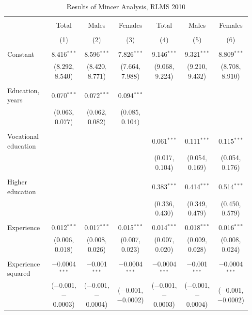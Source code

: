 \documentclass[alpha-refs]{wiley-article-01g}
\begin{document}
\begin{landscape}

\fontsize{9}{11}
\selectfont

\begin{table}[!htbp] \centering 
\renewcommand{\arraystretch}{1.0}
  \caption{Results of Mincer Analysis, RLMS 2010} 
  \label{} 
\begin{tabular}{@{\extracolsep{5pt}}lcccccc} 
\\[-1.8ex]\hline 
\hline \\[-1.8ex] 
 & Total & Males & Females & Total & Males & Females \\ 
\\[-1.8ex] & (1) & (2) & (3) & (4) & (5) & (6)\\ 
\hline \\[-1.8ex] 
 Constant & 8.416$^{***}$ & 8.596$^{***}$ & 7.826$^{***}$ & 9.146$^{***}$ & 9.321$^{***}$ & 8.809$^{***}$ \\ 
  & (8.292, 8.540) & (8.420, 8.771) & (7.664, 7.988) & (9.068, 9.224) & (9.210, 9.432) & (8.708, 8.910) \\ 
  & & & & & & \\ 
 Education, years & 0.070$^{***}$ & 0.072$^{***}$ & 0.094$^{***}$ &  &  &  \\ 
  & (0.063, 0.077) & (0.062, 0.082) & (0.085, 0.104) &  &  &  \\ 
  & & & & & & \\ 
 Vocational education &  &  &  & 0.061$^{***}$ & 0.111$^{***}$ & 0.115$^{***}$ \\ 
  &  &  &  & (0.017, 0.104) & (0.054, 0.169) & (0.054, 0.176) \\ 
  & & & & & & \\ 
 Higher education &  &  &  & 0.383$^{***}$ & 0.414$^{***}$ & 0.514$^{***}$ \\ 
  &  &  &  & (0.336, 0.430) & (0.349, 0.479) & (0.450, 0.579) \\ 
  & & & & & & \\ 
 Experience & 0.012$^{***}$ & 0.017$^{***}$ & 0.015$^{***}$ & 0.014$^{***}$ & 0.018$^{***}$ & 0.016$^{***}$ \\ 
  & (0.006, 0.018) & (0.008, 0.026) & (0.007, 0.023) & (0.007, 0.020) & (0.009, 0.028) & (0.008, 0.024) \\ 
  & & & & & & \\ 
 Experience squared & $-$0.0004$^{***}$ & $-$0.001$^{***}$ & $-$0.0004$^{***}$ & $-$0.0004$^{***}$ & $-$0.001$^{***}$ & $-$0.0004$^{***}$ \\ 
  & ($-$0.001, $-$0.0003) & ($-$0.001, $-$0.0004) & ($-$0.001, $-$0.0002) & ($-$0.001, $-$0.0003) & ($-$0.001, $-$0.0004) & ($-$0.001, $-$0.0002) \\ 

\end{tabular}
\end{table}
\end{landscape}
\end{document}
